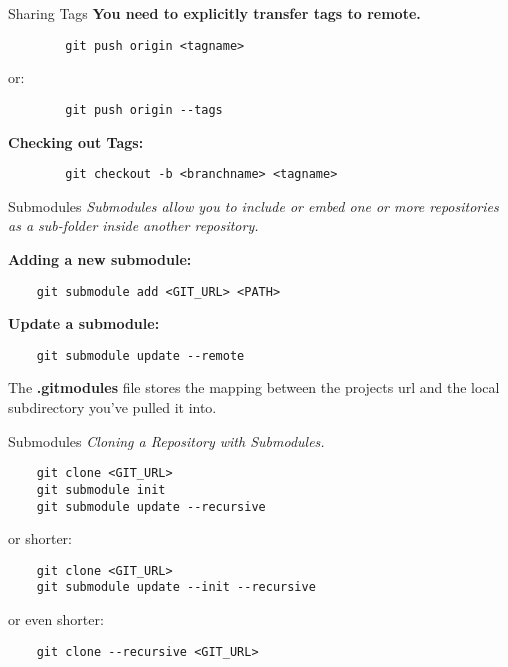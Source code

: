 \begin{frame}[fragile]{Sharing Tags}
    \textbf{You need to explicitly transfer tags to remote.}
    \begin{lstlisting}
        git push origin <tagname>
    \end{lstlisting}
    or:
    \begin{lstlisting}
        git push origin --tags
    \end{lstlisting}
    \textbf{Checking out Tags:}
    \begin{lstlisting}
        git checkout -b <branchname> <tagname>
    \end{lstlisting}
\end{frame}



\begin{frame}[fragile]{Submodules}
    \emph{Submodules allow you to include or embed one or more repositories as a
        sub-folder inside another repository.}
    \vspace{1cm}


    \textbf{Adding a new submodule:}
    \begin{lstlisting}
    git submodule add <GIT_URL> <PATH>
    \end{lstlisting}
    \textbf{Update a submodule:}
    \begin{lstlisting}
    git submodule update --remote
    \end{lstlisting}

    The \textbf{.gitmodules} file stores the mapping between the projects url
    and the local subdirectory you've pulled it into.

\end{frame}

\begin{frame}[fragile]{Submodules}
    \emph{Cloning a Repository with Submodules.}
    \vspace{1cm}

    \begin{lstlisting}
    git clone <GIT_URL>
    git submodule init
    git submodule update --recursive
    \end{lstlisting}
    or shorter:
    \begin{lstlisting}
    git clone <GIT_URL>
    git submodule update --init --recursive
    \end{lstlisting}
    or even shorter:
    \begin{lstlisting}
    git clone --recursive <GIT_URL>
    \end{lstlisting}

\end{frame}

